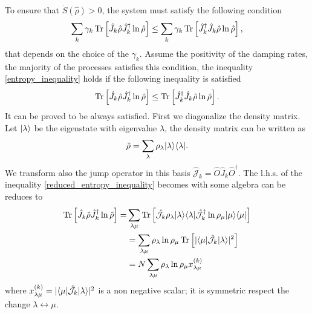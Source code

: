 To ensure that $\dot S(\hat\rho) > 0$, the system must satisfy the following condition
\begin{equation}\label{entropy_inequality}
    \sum_{k}\gamma_{k}\operatorname{Tr}\left[\hat J_{k}\hat\rho\hat J_{k}^\dagger\ln\hat\rho\right] \leq \sum_{k}\gamma_{k} \operatorname{Tr}\left[\hat J_{k}^\dagger\hat J_{k}\hat\rho\ln\hat\rho\right],
\end{equation}
that depends on the choice of the $\gamma_{k}$. 
Assume the positivity of the damping rates, the majority of the processes satisfies this condition, the inequality \eqref{entropy_inequality} holds if the following inequality is satisfied
\begin{equation}\label{reduced_entropy_inequality}
    \operatorname{Tr}\left[\hat J_{k}\hat\rho\hat J_{k}^\dagger\ln\hat\rho\right] \leq \operatorname{Tr}\left[\hat J_{k}^\dagger\hat J_{k}\hat\rho\ln\hat\rho\right].
\end{equation}
It can be proved to be always satisfied.
First we diagonalize the density matrix. Let $\lvert\lambda\rangle$ be the eigenstate with eigenvalue $\lambda$, the density matrix can be written as
\begin{equation}
    \hat \rho = \sum_\lambda \rho_\lambda\lvert\lambda\rangle\langle\lambda\rvert.
\end{equation}
We transform also the jump operator in this basis $\hat{\mathcal{J}}_{k}= \hat O \hat J_{k}\hat O^\dagger$.
The l.h.s. of the inequality \eqref{reduced_entropy_inequality} becomes with some algebra can be reduces to 
\begin{equation}
    \begin{split}
        \operatorname{Tr}\left[\hat J_{k} \hat\rho\hat J_{k}^\dagger\ln\hat\rho\right]=& \sum_{\lambda\mu}\operatorname{Tr}\left[\hat{\mathcal{J}}_{k} \rho_\lambda\lvert\lambda\rangle\langle\lambda\rvert\hat{\mathcal{J}}_{k}^\dagger\ln\rho_\mu \lvert\mu\rangle\langle\mu\rvert\right] \\
        &= \sum_{\lambda\mu}\rho_\lambda\ln\rho_\mu\operatorname{Tr}\left[|\langle\mu\rvert\hat{\mathcal{J}}_{k} \lvert\lambda\rangle|^2\right]\\
        &= N \sum_{\lambda\mu}\rho_\lambda\ln\rho_\mu x^{(k)}_{\lambda\mu}
    \end{split}
\end{equation}
where $x^{(k)}_{\lambda\mu} = |\langle\mu\rvert\hat{\mathcal{J}}_{k} \lvert\lambda\rangle|^2$ is a non negative scalar; it is symmetric respect the change $\lambda \leftrightarrow \mu$. 

